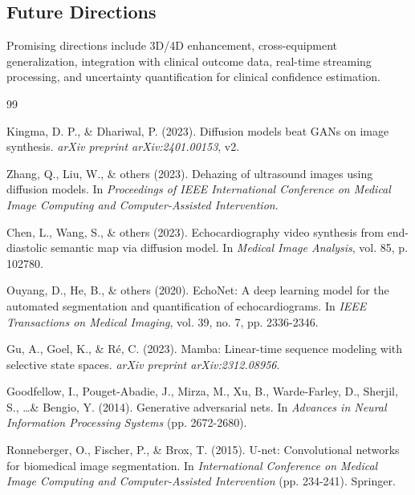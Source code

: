 \documentclass[10pt,conference,letterpaper]{IEEEtran}
\begin{document}
\begin{itemize}
\subsection{Future Directions}

Promising directions include 3D/4D enhancement, cross-equipment generalization, integration with clinical outcome data, real-time streaming processing, and uncertainty quantification for clinical confidence estimation.

\begin{thebibliography}{99}

Kingma, D. P., \& Dhariwal, P. (2023).
\newblock Diffusion models beat GANs on image synthesis.
\newblock \textit{arXiv preprint arXiv:2401.00153}, v2.

Zhang, Q., Liu, W., \& others (2023).
\newblock Dehazing of ultrasound images using diffusion models.
\newblock In \textit{Proceedings of IEEE International Conference on Medical Image Computing and Computer-Assisted Intervention}.

Chen, L., Wang, S., \& others (2023).
\newblock Echocardiography video synthesis from end-diastolic semantic map via diffusion model.
\newblock In \textit{Medical Image Analysis}, vol. 85, p. 102780.

Ouyang, D., He, B., \& others (2020).
\newblock EchoNet: A deep learning model for the automated segmentation and quantification of echocardiograms.
\newblock In \textit{IEEE Transactions on Medical Imaging}, vol. 39, no. 7, pp. 2336-2346.

Gu, A., Goel, K., \& Ré, C. (2023).
\newblock Mamba: Linear-time sequence modeling with selective state spaces.
\newblock \textit{arXiv preprint arXiv:2312.08956}.

Goodfellow, I., Pouget-Abadie, J., Mirza, M., Xu, B., Warde-Farley, D., Sherjil, S., \ldots \& Bengio, Y. (2014).
\newblock Generative adversarial nets.
\newblock In \textit{Advances in Neural Information Processing Systems} (pp. 2672-2680).

Ronneberger, O., Fischer, P., \& Brox, T. (2015).
\newblock U-net: Convolutional networks for biomedical image segmentation.
\newblock In \textit{International Conference on Medical Image Computing and Computer-Assisted Intervention} (pp. 234-241). Springer.


\end{thebibliography}
\end{itemize}
\end{document}
